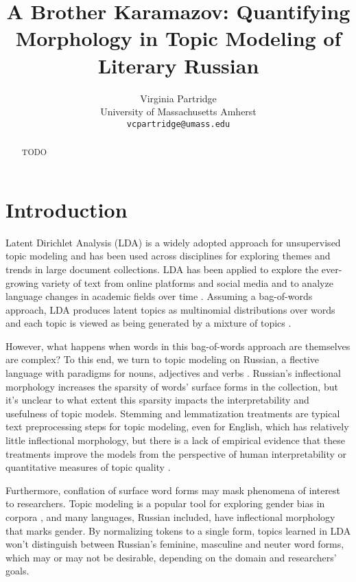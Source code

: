 \documentclass[11pt,a4paper]{article}
\title{A Brother Karamazov: Quantifying Morphology in Topic Modeling of Literary Russian}
\author{Virginia Partridge \\
  University of Massachusetts Amherst\\
  \texttt{vcpartridge@umass.edu}
}
\date{}
\begin{document}
\maketitle
\begin{abstract}
TODO
\end{abstract}

\section{Introduction}
Latent Dirichlet Analysis (LDA) is a widely adopted approach for unsupervised topic modeling and has been used across disciplines for exploring themes and trends in large document collections. LDA has been applied to explore the ever-growing variety of text from online platforms and social media and to analyze language changes in academic fields over time \cite{koltsova2013,mcfarland2013differentiating, vogel-jurafsky-2012-said, mitrofanova2015probabilistic}. Assuming a bag-of-words approach, LDA produces latent topics as multinomial distributions over words and each topic is viewed as being generated by a mixture of topics \cite{blei2003,steyvers2007probabilistic}.

However, what happens when words in this bag-of-words approach are themselves are complex? To this end, we turn to topic modeling on Russian, a flective language with paradigms for nouns, adjectives and verbs \cite{wade2020comprehensive}. Russian's inflectional morphology increases the sparsity of words' surface forms in the collection, but it's unclear to what extent this sparsity impacts the interpretability and usefulness of topic models. Stemming and lemmatization treatments are typical text preprocessing steps for topic modeling, even for English, which has relatively little inflectional morphology, but there is a lack of empirical evidence that these treatments improve the models from the perspective of human interpretability or quantitative measures of topic quality \cite{schofield-mimno-2016-comparing}.

Furthermore, conflation of surface word forms may mask phenomena of interest to researchers. Topic modeling is a popular tool for exploring gender bias in corpora \cite{vogel-jurafsky-2012-said,devinney-etal-2020-semi}, and many languages, Russian included, have inflectional morphology that marks gender. By normalizing tokens to a single form, topics learned in LDA won't distinguish between Russian's feminine, masculine and neuter word forms, which may or may not be desirable, depending on the domain and researchers' goals.
\end{document}
